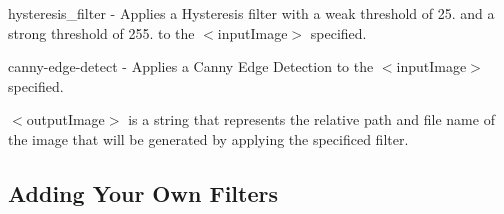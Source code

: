 \begin{DoxyEnumerate}
\begin{DoxyEnumerate}
\begin{DoxyEnumerate}
\item hysteresis\+\_\+filter -\/ Applies a Hysteresis filter with a weak threshold of 25. and a strong threshold of 255. to the {\ttfamily $<$input\+Image$>$} specified.
\item canny-\/edge-\/detect -\/ Applies a Canny Edge Detection to the {\ttfamily $<$input\+Image$>$} specified.
\end{DoxyEnumerate}
\item {\ttfamily $<$output\+Image$>$} is a string that represents the relative path and file name of the image that will be generated by applying the specificed filter.
\end{DoxyEnumerate}
\end{DoxyEnumerate}

\subsection*{Adding Your Own Filters}

